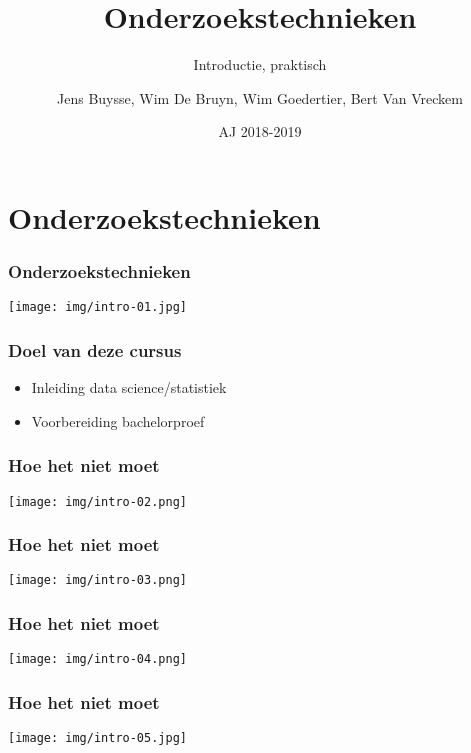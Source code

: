 \documentclass[aspectratio=169]{beamer}
\title[OZT: Intro]{Onderzoekstechnieken}
\subtitle{Introductie, praktisch}
\author{Jens Buysse, Wim {De Bruyn}, Wim Goedertier, Bert {Van Vreckem}}
\date{AJ 2018-2019}
\begin{document}

\begin{frame}
  \maketitle
\end{frame}

\section{Onderzoekstechnieken}

\begin{frame}
  \frametitle{Onderzoekstechnieken}

  \centering
  \texttt{[image: img/intro-01.jpg]}
\end{frame}

\begin{frame}
  \frametitle{Doel van deze cursus}
  
  \begin{itemize}
    \item Inleiding data science/statistiek
    \item Voorbereiding bachelorproef
  \end{itemize}
\end{frame}

\begin{frame}
  \frametitle{Hoe het niet moet}
  
  \centering
  \texttt{[image: img/intro-02.png]}
\end{frame}

\begin{frame}
  \frametitle{Hoe het niet moet}
  
  \centering
  \texttt{[image: img/intro-03.png]}
\end{frame}

\begin{frame}
  \frametitle{Hoe het niet moet}

  \centering
  \texttt{[image: img/intro-04.png]}
\end{frame}

\begin{frame}
  \frametitle{Hoe het niet moet}

  \centering
  \texttt{[image: img/intro-05.jpg]}
\end{frame}
\end{document}
